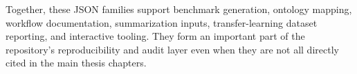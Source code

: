 \documentclass[12pt,a4paper]{report}
\begin{document}
Together, these JSON families support benchmark generation, ontology mapping, workflow documentation, summarization inputs, transfer-learning dataset reporting, and interactive tooling. They form an important part of the repository's reproducibility and audit layer even when they are not all directly cited in the main thesis chapters.
\end{document}
